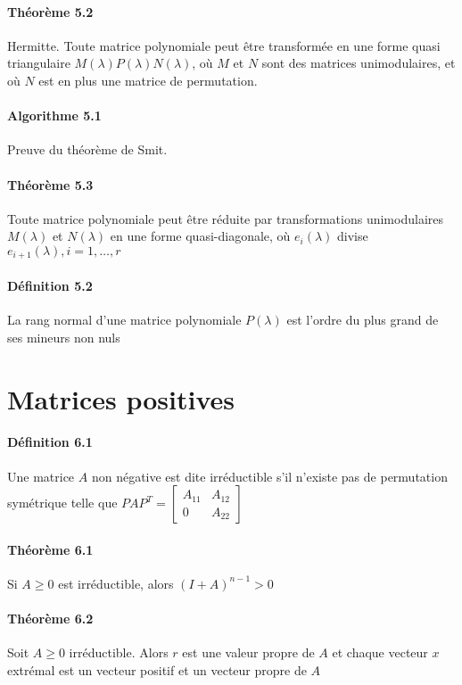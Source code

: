 \paragraph{Théorème 5.2} Hermitte. Toute matrice polynomiale peut être transformée en une forme quasi triangulaire $M(\lambda)P(\lambda)N(\lambda)$, où $M$ et $N$ sont des matrices unimodulaires, et où $N$ est en plus une matrice de permutation.

\paragraph{Algorithme 5.1} Preuve du théorème de Smit.

\paragraph{Théorème 5.3} Toute matrice polynomiale peut être réduite par transformations unimodulaires $M(\lambda)$ et $N(\lambda)$ en une forme quasi-diagonale, où $e_i(\lambda)$ divise $e_{i+1}(\lambda), i=1,\dots,r$

\paragraph{Définition 5.2} La rang normal d'une matrice polynomiale $P(\lambda)$ est l'ordre du plus grand de ses mineurs non nuls

\section{Matrices positives}

\paragraph{Définition 6.1} Une matrice $A$ non négative est dite irréductible s'il n'existe pas de permutation symétrique telle que $PAP^T = \begin{bmatrix}
A_{11} & A_{12} \\
0 & A_{22}
\end{bmatrix}$

\paragraph{Théorème 6.1} Si $A \geq 0$ est irréductible, alors $(I+A)^{n-1}>0$

\paragraph{Théorème 6.2} Soit $A \geq 0$ irréductible.  Alors $r$ est une valeur propre de $A$ et chaque vecteur $x$ extrémal est un vecteur positif et un vecteur propre de $A$

